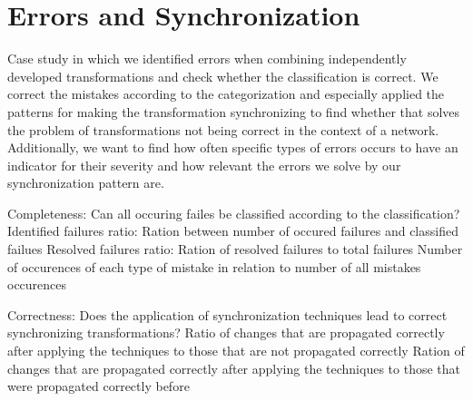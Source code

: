 \section{Errors and Synchronization}

Case study in which we identified errors when combining independently developed transformations and check whether the classification is correct. We correct the mistakes according to the categorization and especially applied the patterns for making the transformation synchronizing to find whether that solves the problem of transformations not being correct in the context of a network. Additionally, we want to find how often specific types of errors occurs to have an indicator for their severity and how relevant the errors we solve by our synchronization pattern are.

{Completeness: Can all occuring failes be classified according to the classification?}
{Identified failures ratio: Ration between number of occured failures and classified failues}
{Resolved failures ratio: Ration of resolved failures to total failures}
{Number of occurences of each type of mistake in relation to number of all mistakes occurences}

{Correctness: Does the application of synchronization techniques lead to correct synchronizing transformations?}
{Ratio of changes that are propagated correctly after applying the techniques to those that are not propagated correctly}
{Ration of changes that are propagated correctly after applying the techniques to those that were propagated correctly before}



